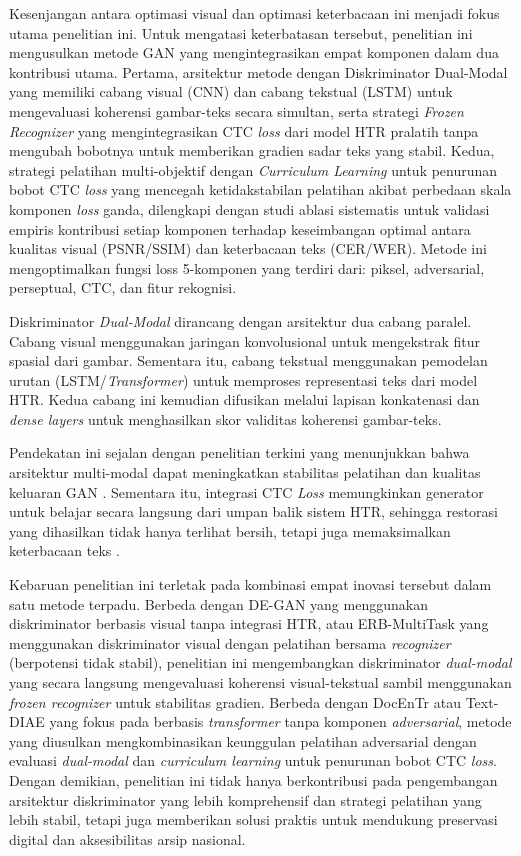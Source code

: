 \documentclass[12pt,a4paper]{article}
\begin{document}
Kesenjangan antara optimasi visual dan optimasi keterbacaan ini menjadi fokus utama penelitian ini. Untuk mengatasi keterbatasan tersebut, penelitian ini mengusulkan metode GAN yang mengintegrasikan empat komponen dalam dua kontribusi utama. Pertama, arsitektur metode dengan Diskriminator Dual-Modal yang memiliki cabang visual (CNN) dan cabang tekstual (LSTM) untuk mengevaluasi koherensi gambar-teks secara simultan, serta strategi \textit{Frozen Recognizer} yang mengintegrasikan CTC \textit{loss} dari model HTR pralatih tanpa mengubah bobotnya untuk memberikan gradien sadar teks yang stabil. Kedua, strategi pelatihan multi-objektif dengan \textit{Curriculum Learning} untuk penurunan bobot CTC \textit{loss} yang mencegah ketidakstabilan pelatihan akibat perbedaan skala komponen \textit{loss} ganda, dilengkapi dengan studi ablasi sistematis untuk validasi empiris kontribusi setiap komponen terhadap keseimbangan optimal antara kualitas visual (PSNR/SSIM) dan keterbacaan teks (CER/WER). Metode ini mengoptimalkan fungsi loss 5-komponen yang terdiri dari: piksel, adversarial, perseptual, CTC, dan fitur rekognisi.


Diskriminator \textit{Dual-Modal} dirancang dengan arsitektur dua cabang paralel. Cabang visual menggunakan jaringan konvolusional untuk mengekstrak fitur spasial dari gambar. Sementara itu, cabang tekstual menggunakan pemodelan urutan (LSTM/\textit{Transformer}) untuk memproses representasi teks dari model HTR. Kedua cabang ini kemudian difusikan melalui lapisan konkatenasi dan \textit{dense layers} untuk menghasilkan skor validitas koherensi gambar-teks.


Pendekatan ini sejalan dengan penelitian terkini yang menunjukkan bahwa arsitektur multi-modal dapat meningkatkan stabilitas pelatihan dan kualitas keluaran GAN \parencite{baltrusaitis2019}. Sementara itu, integrasi CTC \textit{Loss} memungkinkan generator untuk belajar secara langsung dari umpan balik sistem HTR, sehingga restorasi yang dihasilkan tidak hanya terlihat bersih, tetapi juga memaksimalkan keterbacaan teks \parencite{graves2006}.


Kebaruan penelitian ini terletak pada kombinasi empat inovasi tersebut dalam satu metode terpadu. Berbeda dengan DE-GAN yang menggunakan diskriminator berbasis visual tanpa integrasi HTR, atau ERB-MultiTask yang menggunakan diskriminator visual dengan pelatihan bersama \textit{recognizer} (berpotensi tidak stabil), penelitian ini mengembangkan diskriminator \textit{dual-modal} yang secara langsung mengevaluasi koherensi visual-tekstual sambil menggunakan \textit{frozen recognizer} untuk stabilitas gradien. Berbeda dengan DocEnTr atau Text-DIAE yang fokus pada berbasis \textit{transformer} tanpa komponen \textit{adversarial}, metode yang diusulkan mengkombinasikan keunggulan pelatihan adversarial dengan evaluasi \textit{dual-modal} dan \textit{curriculum learning} untuk penurunan bobot CTC \textit{loss}. Dengan demikian, penelitian ini tidak hanya berkontribusi pada pengembangan arsitektur diskriminator yang lebih komprehensif dan strategi pelatihan yang lebih stabil, tetapi juga memberikan solusi praktis untuk mendukung preservasi digital dan aksesibilitas arsip nasional.
\end{document}
